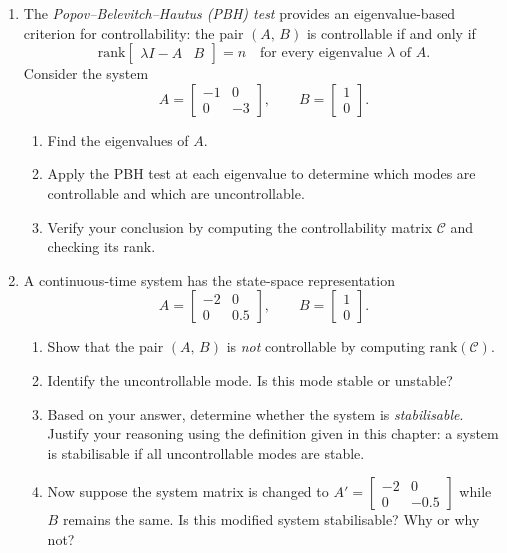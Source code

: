 \begin{enumerate}
\item The \emph{Popov--Belevitch--Hautus (PBH) test} provides an eigenvalue-based criterion for controllability: the pair $(A,\,B)$ is controllable if and only if
\[
\text{rank}\!\begin{bmatrix} \lambda I - A & B \end{bmatrix} = n \quad \text{for every eigenvalue } \lambda \text{ of } A.
\]
Consider the system
\[
A = \begin{bmatrix} -1 & 0 \\ 0 & -3 \end{bmatrix}, \qquad
B = \begin{bmatrix} 1 \\ 0 \end{bmatrix}.
\]
\begin{enumerate}
	\item Find the eigenvalues of $A$.
	\item Apply the PBH test at each eigenvalue to determine which modes are controllable and which are uncontrollable.
	\item Verify your conclusion by computing the controllability matrix $\mathcal{C}$ and checking its rank.
\end{enumerate}

\item A continuous-time system has the state-space representation
\[
A = \begin{bmatrix} -2 & 0 \\ 0 & 0.5 \end{bmatrix}, \qquad
B = \begin{bmatrix} 1 \\ 0 \end{bmatrix}.
\]
\begin{enumerate}
	\item Show that the pair $(A,\,B)$ is \emph{not} controllable by computing $\text{rank}(\mathcal{C})$.
	\item Identify the uncontrollable mode. Is this mode stable or unstable?
	\item Based on your answer, determine whether the system is \emph{stabilisable}. Justify your reasoning using the definition given in this chapter: a system is stabilisable if all uncontrollable modes are stable.
	\item Now suppose the system matrix is changed to $A' = \begin{bmatrix} -2 & 0 \\ 0 & -0.5 \end{bmatrix}$ while $B$ remains the same. Is this modified system stabilisable? Why or why not?
\end{enumerate}


\end{enumerate}
